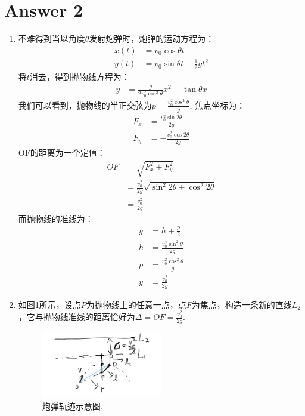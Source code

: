 \section*{Answer 2}
\begin{enumerate}
	\item 不难得到当以角度\(\theta\)发射炮弹时，炮弹的运动方程为：
	\begin{align*}
		x(t) &= v_0 \cos \theta t \\
		y(t) &= v_0 \sin \theta t - \frac{1}{2}gt^2
	\end{align*}
	将\(t\)消去，得到抛物线方程为：
	\begin{align*}
		y &= \frac{g}{2v_0^2 \cos^2 \theta} x^2 - \tan \theta x
	\end{align*}
		我们可以看到，抛物线的半正交弦为\(p=\frac{v_0^2 \cos^2 \theta}{g}\), 
		焦点坐标为：
	\begin{align*}
			F_x &= \frac{v_0^2 \sin2 \theta}{2g} \\
			F_y &= -\frac{v_0^2 \cos2 \theta}{2g}
	\end{align*}
	OF的距离为一个定值：
	\begin{align*}
		OF &= \sqrt{F_x^2 + F_y^2} \\
		   &= \frac{v_0^2}{2g} \sqrt{\sin^2 2\theta + \cos^2 2\theta} \\
		   &= \frac{v_0^2}{2g}
	\end{align*}
		而抛物线的准线为：
	\begin{align*}
		y &=h + \frac{p}{2} \\
		h &= \frac{v_0^2 \sin^2 \theta}{2g} \\
		p &= \frac{v_0^2 \cos^2 \theta}{g} \\
		y &= \frac{v_0^2}{2g} 
	\end{align*}
	\item 如图\ref{fire1a}所示，设点\(P\)为抛物线上的任意一点，点\(F\)为焦点，构造一条新的直线\(L_2\)，它与抛物线准线的距离恰好为\(\Delta = OF = \frac{v_0^2}{2g}\).
	\begin{figure}[htbp]
	\centering
	\includegraphics[width=0.5\textwidth]{fire1a}
	\caption{炮弹轨迹示意图.}
	\label{fire1a}
	\end{figure}

\end{enumerate}
